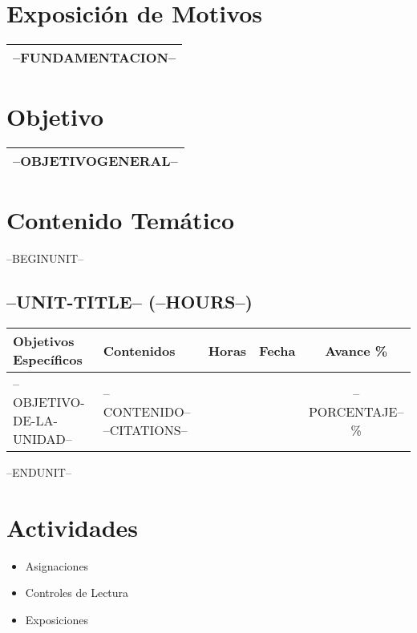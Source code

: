 \documentclass[a4paper]{article}
\begin{document}
\bigskip

\section{Exposición de Motivos}
\begin{tabularx}{\textwidth}{|X|}\hline
--FUNDAMENTACION--
\\ \hline
\end{tabularx}

\section{Objetivo}
\begin{tabularx}{\textwidth}{|X|} \hline
--OBJETIVOGENERAL-- 
\\ \hline
\end{tabularx}

\section{Contenido Temático}
--BEGINUNIT--
\subsection{--UNIT-TITLE-- (--HOURS--)}
\begin{tabularx}{\textwidth}{|X|X|c|c|c|}
\hline
\textbf{Objetivos Especí­ficos} &   \textbf{Contenidos} & \textbf{Horas} & \textbf{Fecha} & \textbf{Avance \%}  \\ \hline
--OBJETIVO-DE-LA-UNIDAD--      & 
--CONTENIDO--
--CITATIONS-- &
&
&
--PORCENTAJE--\%
\\
\hline
\end{tabularx}

--ENDUNIT--


\section{Actividades}
\begin{itemize}
\item Asignaciones
\item Controles de Lectura
\item Exposiciones
\end{itemize} 
\end{document}
